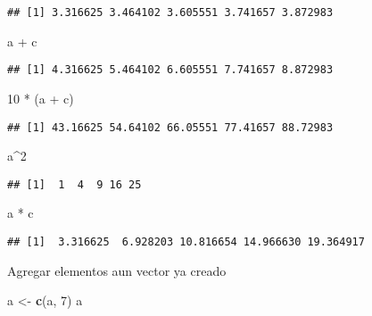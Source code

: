 \documentclass[]{article}
\newenvironment{Shaded}{\begin{snugshade}}{\end{snugshade}}
\newcommand{\KeywordTok}[1]{\textcolor[rgb]{0.13,0.29,0.53}{\textbf{{#1}}}}
\newcommand{\DecValTok}[1]{\textcolor[rgb]{0.00,0.00,0.81}{{#1}}}
\newcommand{\StringTok}[1]{\textcolor[rgb]{0.31,0.60,0.02}{{#1}}}
\newcommand{\NormalTok}[1]{{#1}}
\begin{document}
\begin{verbatim}
## [1] 3.316625 3.464102 3.605551 3.741657 3.872983
\end{verbatim}

\begin{Shaded}
\begin{Highlighting}[]
\NormalTok{a +}\StringTok{ }\NormalTok{c}
\end{Highlighting}
\end{Shaded}

\begin{verbatim}
## [1] 4.316625 5.464102 6.605551 7.741657 8.872983
\end{verbatim}

\begin{Shaded}
\begin{Highlighting}[]
\DecValTok{10} \NormalTok{*}\StringTok{ }\NormalTok{(a +}\StringTok{ }\NormalTok{c)}
\end{Highlighting}
\end{Shaded}

\begin{verbatim}
## [1] 43.16625 54.64102 66.05551 77.41657 88.72983
\end{verbatim}

\begin{Shaded}
\begin{Highlighting}[]
\NormalTok{a^}\DecValTok{2}
\end{Highlighting}
\end{Shaded}

\begin{verbatim}
## [1]  1  4  9 16 25
\end{verbatim}

\begin{Shaded}
\begin{Highlighting}[]
\NormalTok{a *}\StringTok{ }\NormalTok{c}
\end{Highlighting}
\end{Shaded}

\begin{verbatim}
## [1]  3.316625  6.928203 10.816654 14.966630 19.364917
\end{verbatim}

Agregar elementos aun vector ya creado

\begin{Shaded}
\begin{Highlighting}[]
\NormalTok{a <-}\StringTok{ }\KeywordTok{c}\NormalTok{(a, }\DecValTok{7}\NormalTok{)}
\NormalTok{a}
\end{Highlighting}
\end{Shaded}
\end{document}
